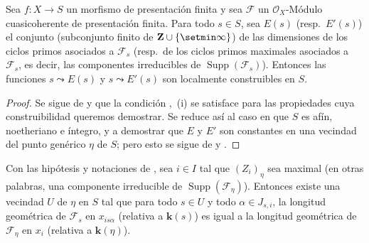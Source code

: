 \begin{proposition}[9.8.5]
\label{IV.9.8.5}
Sea $f:X\to S$ un morfismo de presentación finita y sea $\mathcal F$ un $\mathcal O_X$-Módulo cuasicoherente de presentación finita.
Para todo $s\in S$, sea $E(s)$ \textup{(resp.}~$E'(s)$\textup{)} el conjunto (subconjunto finito de $\mathbf Z\cup\{\setmin\infty\}$) de las dimensiones de los ciclos primos asociados a $\mathcal F_s$ \textup{(resp.}~de los ciclos primos maximales asociados a $\mathcal F_s$, es decir, las componentes irreducibles de $\operatorname{Supp}(\mathcal F_s)$\textup{)}.
Entonces las funciones $s\leadsto E(s)$ y $s\leadsto E'(s)$ son localmente construibles en $S$.
\end{proposition}

\begin{proof}
\label{IV.9.8.5-proof}
Se sigue de  y  que la condición ,~(i) se satisface para las propiedades cuya construibilidad queremos demostrar.
Se reduce así al caso en que $S$ es afín, noetheriano e íntegro, y a demostrar que $E$ y $E'$ son constantes en una vecindad del punto genérico $\eta$ de $S$; pero esto se sigue de  y .
\end{proof}

\begin{proposition}[9.8.6]
\label{IV.9.8.6}
Con las hipótesis y notaciones de \emph{}, sea $i\in I$ tal que $(Z_i)_\eta$ sea maximal (en otras palabras, una componente irreducible de $\operatorname{Supp}(\mathcal F_\eta)$).
Entonces existe una vecindad $U$ de $\eta$ en $S$ tal que para todo $s\in U$ y todo $\alpha\in J_{s,i}$, la longitud geométrica de $\mathcal F_s$ en $x_{is\alpha}$ (relativa a $\boldsymbol{k}(s)$)  es igual a la longitud geométrica de $\mathcal F_\eta$ en $x_i$ (relativa a $\boldsymbol{k}(\eta)$).
\end{proposition}


